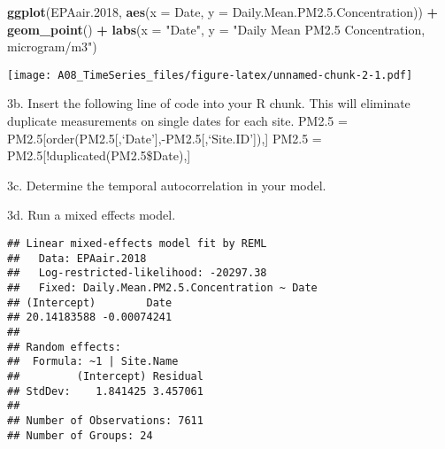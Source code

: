 \documentclass[]{article}
\newenvironment{Shaded}{\begin{snugshade}}{\end{snugshade}}
\newcommand{\KeywordTok}[1]{\textcolor[rgb]{0.13,0.29,0.53}{\textbf{#1}}}
\newcommand{\DataTypeTok}[1]{\textcolor[rgb]{0.13,0.29,0.53}{#1}}
\newcommand{\DecValTok}[1]{\textcolor[rgb]{0.00,0.00,0.81}{#1}}
\newcommand{\FloatTok}[1]{\textcolor[rgb]{0.00,0.00,0.81}{#1}}
\newcommand{\StringTok}[1]{\textcolor[rgb]{0.31,0.60,0.02}{#1}}
\newcommand{\CommentTok}[1]{\textcolor[rgb]{0.56,0.35,0.01}{\textit{#1}}}
\newcommand{\OperatorTok}[1]{\textcolor[rgb]{0.81,0.36,0.00}{\textbf{#1}}}
\newcommand{\NormalTok}[1]{#1}
\begin{document}
\begin{Shaded}
\begin{Highlighting}[]
\KeywordTok{ggplot}\NormalTok{(EPAair.}\DecValTok{2018}\NormalTok{, }\KeywordTok{aes}\NormalTok{(}\DataTypeTok{x =}\NormalTok{ Date, }\DataTypeTok{y =}\NormalTok{ Daily.Mean.PM2.}\FloatTok{5.}\NormalTok{Concentration)) }\OperatorTok{+}
\StringTok{  }\KeywordTok{geom_point}\NormalTok{() }\OperatorTok{+}
\StringTok{  }\KeywordTok{labs}\NormalTok{(}\DataTypeTok{x =} \StringTok{"Date"}\NormalTok{, }\DataTypeTok{y =} \StringTok{"Daily Mean PM2.5 Concentration, microgram/m3"}\NormalTok{) }
\end{Highlighting}
\end{Shaded}

\texttt{[image: A08\_TimeSeries\_files/figure-latex/unnamed-chunk-2-1.pdf]}

3b. Insert the following line of code into your R chunk. This will
eliminate duplicate measurements on single dates for each site. PM2.5 =
PM2.5{[}order(PM2.5{[},`Date'{]},-PM2.5{[},`Site.ID'{]}),{]} PM2.5 =
PM2.5{[}!duplicated(PM2.5\$Date),{]}

3c. Determine the temporal autocorrelation in your model.

3d. Run a mixed effects model.

\begin{Shaded}
\end{Shaded}

\begin{verbatim}
## Linear mixed-effects model fit by REML
##   Data: EPAair.2018 
##   Log-restricted-likelihood: -20297.38
##   Fixed: Daily.Mean.PM2.5.Concentration ~ Date 
## (Intercept)        Date 
## 20.14183588 -0.00074241 
## 
## Random effects:
##  Formula: ~1 | Site.Name
##         (Intercept) Residual
## StdDev:    1.841425 3.457061
## 
## Number of Observations: 7611
## Number of Groups: 24
\end{verbatim}
\end{document}
